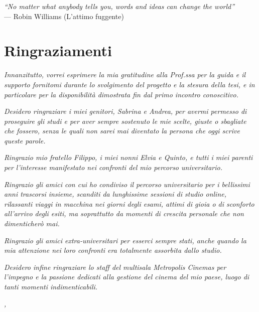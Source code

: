 \cleardoublepage
{}
{}

\begin{flushright}{
    \slshape
    ``No matter what anybody tells you, words and ideas can change the world''} \\
    \medskip
    --- Robin Williams (L'attimo fuggente)
\end{flushright}


\bigskip

\begingroup
\let\clearpage\relax
\let\cleardoublepage\relax
\let\cleardoublepage\relax

\chapter*{Ringraziamenti}

\par \textit{Innanzitutto, vorrei esprimere la mia gratitudine alla Prof.ssa \myProf per la guida e il supporto fornitomi durante lo svolgimento del progetto e la stesura della tesi, e in particolare per la disponibilità dimostrata fin dal primo incontro conoscitivo.}

\vspace{10pt}
\par\noindent \textit{Desidero ringraziare i miei genitori, Sabrina e Andrea, per avermi permesso di proseguire gli studi e per aver sempre sostenuto le mie scelte, giuste o sbagliate che fossero, senza le quali non sarei mai diventato la persona che oggi scrive queste parole.}

\vspace{10pt}
\par\noindent \textit{Ringrazio mio fratello Filippo, i miei nonni Elvia e Quinto, e tutti i miei parenti per l’interesse manifestato nei confronti del mio percorso universitario.}

\vspace{10pt}
\par\noindent \textit{Ringrazio gli amici con cui ho condiviso il percorso universitario per i bellissimi anni trascorsi insieme, scanditi da lunghissime sessioni di studio online, rilassanti viaggi in macchina nei giorni degli esami, attimi di gioia o di sconforto all’arrivo degli esiti, ma soprattutto da momenti di crescita personale che non dimenticherò mai.}

\vspace{10pt}
\par\noindent \textit{Ringrazio gli amici extra-universitari per esserci sempre stati, anche quando la mia attenzione nei loro confronti era totalmente assorbita dallo studio.}

\vspace{10pt}
\par\noindent \textit{Desidero infine ringraziare lo staff del multisala Metropolis Cinemas per l’impegno e la passione dedicati alla gestione del cinema del mio paese, luogo di tanti momenti indimenticabili.}
\bigskip

\noindent\textit{\myLocation, \myTime}
\hfill \myName

\endgroup
